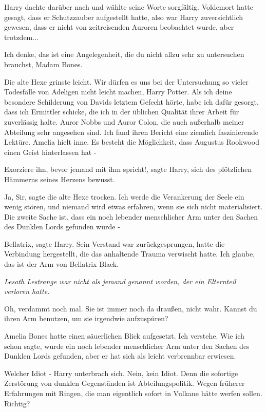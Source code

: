 Harry dachte darüber nach und wählte seine Worte sorgfältig. Voldemort hatte
gesagt, dass er Schutzzauber aufgestellt hatte, also war Harry zuversichtlich
gewesen, dass er nicht von zeitreisenden Auroren beobachtet wurde, aber
trotzdem...

\glqq{}Ich denke, das ist eine Angelegenheit, die du nicht allzu sehr zu
untersuchen brauchst, Madam Bones.\grqq{}

Die alte Hexe grinste leicht. \glqq{}Wir dürfen es uns bei der Untersuchung so
vieler Todesfälle von Adeligen nicht leicht machen, Harry Potter. Als ich deine
besondere Schilderung von Davids letztem Gefecht hörte, habe ich dafür gesorgt,
dass ich Ermittler schicke, die ich in der üblichen Qualität ihrer Arbeit für
zuverlässig halte. Auror Nobbs und Auror Colon, die auch außerhalb meiner
Abteilung sehr angesehen sind. Ich fand ihren Bericht eine ziemlich
faszinierende Lektüre.\grqq{} Amelia hielt inne. \glqq{}Es besteht die Möglichkeit,
dass Augustus Rookwood einen Geist hinterlassen hat -\grqq{}

\glqq{}Exorziere ihn, bevor jemand mit ihm spricht!\grqq{}, sagte Harry, sich des
plötzlichen Hämmerns seines Herzens bewusst.

\glqq{}Ja, Sir\grqq{}, sagte die alte Hexe trocken. \glqq{}Ich werde die
Verankerung der Seele ein wenig stören, und niemand wird etwas erfahren, wenn
sie sich nicht materialisiert. Die zweite Sache ist, dass ein noch lebender
menschlicher Arm unter den Sachen des Dunklen Lords gefunden wurde -\grqq{}

\glqq{}Bellatrix\grqq{}, sagte Harry. Sein Verstand war zurückgesprungen, hatte
die Verbindung hergestellt, die das anhaltende Trauma verwischt hatte. \glqq{}Ich
glaube, das ist der Arm von Bellatrix Black.\grqq{}

\emph{Lesath Lestrange war nicht als jemand genannt worden, der ein Elternteil
verloren hatte.}

\glqq{}Oh, verdammt noch mal. Sie ist immer noch da draußen, nicht wahr. Kannst
du ihren Arm benutzen, um sie irgendwie aufzuspüren?\grqq{}

Amelia Bones hatte einen säuerlichen Blick aufgesetzt. \glqq{}Ich verstehe. Wie
ich schon sagte, wurde ein noch lebender menschlicher Arm unter den Sachen des
Dunklen Lords gefunden, aber er hat sich als leicht verbrennbar erwiesen.\grqq{}

\glqq{}Welcher Idiot -\grqq{} Harry unterbrach sich. \glqq{}Nein, kein Idiot. Denn die
sofortige Zerstörung von dunklen Gegenständen ist Abteilungspolitik. Wegen
früherer Erfahrungen mit Ringen, die man eigentlich sofort in Vulkane hätte
werfen sollen. Richtig?\grqq{}

